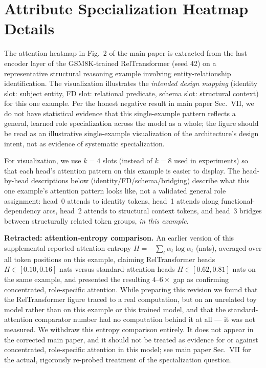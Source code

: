 \documentclass[conference]{IEEEtran}
\begin{document}
\section{Attribute Specialization Heatmap Details}
\label{app:heatmap}

The attention heatmap in Fig.~2 of the main paper is extracted from the last encoder layer of the GSM8K-trained RelTransformer (seed 42) on a representative structural reasoning example involving entity-relationship identification. The visualization illustrates the \emph{intended design mapping} (identity slot: subject entity, FD slot: relational predicate, schema slot: structural context) for this one example. Per the honest negative result in main paper Sec.~VII, we do not have statistical evidence that this single-example pattern reflects a general, learned role specialization across the model as a whole; the figure should be read as an illustrative single-example visualization of the architecture's design intent, not as evidence of systematic specialization.

For visualization, we use $k=4$ slots (instead of $k=8$ used in experiments) so that each head's attention pattern on this example is easier to display. The head-by-head descriptions below (identity/FD/schema/bridging) describe what this one example's attention pattern looks like, not a validated general role assignment: head~0 attends to identity tokens, head~1 attends along functional-dependency arcs, head~2 attends to structural context tokens, and head~3 bridges between structurally related token groups, \emph{in this example}.

\textbf{Retracted: attention-entropy comparison.} An earlier version of this supplemental reported attention entropy $H = -\sum_t \alpha_t \log \alpha_t$ (nats), averaged over all token positions on this example, claiming RelTransformer heads $H \in [0.10, 0.16]$ nats versus standard-attention heads $H \in [0.62, 0.81]$ nats on the same example, and presented the resulting $4$--$6\times$ gap as confirming concentrated, role-specific attention. While preparing this revision we found that the RelTransformer figure traced to a real computation, but on an unrelated toy model rather than on this example or this trained model, and that the standard-attention comparator number had no computation behind it at all --- it was not measured. We withdraw this entropy comparison entirely. It does not appear in the corrected main paper, and it should not be treated as evidence for or against concentrated, role-specific attention in this model; see main paper Sec.~VII for the actual, rigorously re-probed treatment of the specialization question.
\end{document}
